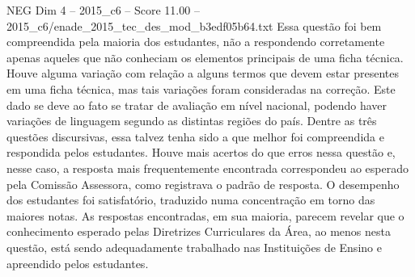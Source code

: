 \begin{textsample}{NEG Dim 4 – 2015\_c6 – Score 11.00 – 2015\_c6/enade\_2015\_tec\_des\_mod\_b3edf05b64.txt}
Essa questão foi bem compreendida pela maioria dos estudantes, não a respondendo corretamente apenas aqueles que não conheciam os elementos principais de uma ficha técnica.
Houve alguma variação com relação a alguns termos que devem estar presentes em uma ficha técnica, mas tais variações foram consideradas na correção.
Este dado se deve ao fato se tratar de avaliação em nível nacional, podendo haver variações de linguagem segundo as distintas regiões do país.
Dentre as três questões discursivas, essa talvez tenha sido a que melhor foi compreendida e respondida pelos estudantes.
Houve mais acertos do que erros nessa questão e, nesse caso, a resposta mais frequentemente encontrada correspondeu ao esperado pela Comissão Assessora, como registrava o padrão de resposta.
O desempenho dos estudantes foi satisfatório, traduzido numa concentração em torno das maiores notas.
As respostas encontradas, em sua maioria, parecem revelar que o conhecimento esperado pelas Diretrizes Curriculares da Área, ao menos nesta questão, está sendo adequadamente trabalhado nas Instituições de Ensino e apreendido pelos estudantes.

\end{textsample}
